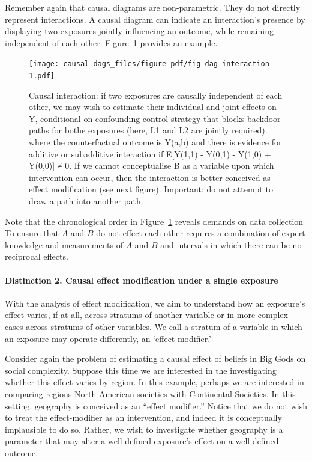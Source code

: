 \documentclass[
  singlecolumn,
  9pt]{article}
\let\oldparagraph\paragraph
\renewcommand{\paragraph}[1]{\oldparagraph{#1}\mbox{}}
\begin{document}
Remember again that causal diagrams are non-parametric. They do not
directly represent interactions. A causal diagram can indicate an
interaction's presence by displaying two exposures jointly influencing
an outcome, while remaining independent of each other.
Figure~\ref{fig-dag-interaction} provides an example.

\begin{figure}

{\centering \texttt{[image: causal-dags\_files/figure-pdf/fig-dag-interaction-1.pdf]}

}

\caption{\label{fig-dag-interaction}Causal interaction: if two exposures
are causally independent of each other, we may wish to estimate their
individual and joint effects on Y, conditional on confounding control
strategy that blocks backdoor paths for bothe exposures (here, L1 and L2
are jointly required). where the counterfactual outcome is Y(a,b) and
there is evidence for additive or subadditive interaction if E{[}Y(1,1)
- Y(0,1) - Y(1,0) + Y(0,0){]} ≠ 0. If we cannot conceptualise B as a
variable upon which intervention can occur, then the interaction is
better conceived as effect modification (see next figure). Important: do
not attempt to draw a path into another path.}

\end{figure}

Note that the chronological order in Figure~\ref{fig-dag-interaction}
reveals demands on data collection To ensure that \(A\) and \(B\) do not
effect each other requires a combination of expert knowledge and
measurements of \(A\) and \(B\) and intervals in which there can be no
reciprocal effects.

\paragraph{Distinction 2. Causal effect modification under a single
exposure}\label{distinction-2.-causal-effect-modification-under-a-single-exposure}

With the analysis of effect modification, we aim to understand how an
exposure's effect varies, if at all, across stratums of another variable
or in more complex cases across stratums of other variables. We call a
stratum of a variable in which an exposure may operate differently, an
`effect modifier.'

Consider again the problem of estimating a causal effect of beliefs in
Big Gods on social complexity. Suppose this time we are interested in
the investigating whether this effect varies by region. In this example,
perhaps we are interested in comparing regions North American societies
with Continental Societies. In this setting, geography is conceived as
an ``effect modifier.'' Notice that we do not wish to treat the
effect-modifier as an intervention, and indeed it is conceptually
implausible to do so. Rather, we wish to investigate whether geography
is a parameter that may alter a well-defined exposure's effect on a
well-defined outcome.
\end{document}
